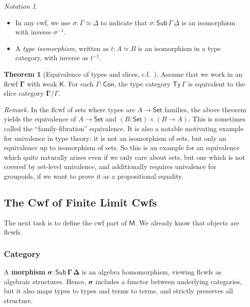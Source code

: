 \documentclass[12pt,a4paper,twoside,openany]{book}
\theoremstyle{remark}
\newtheorem{notation}{Notation}
\theoremstyle{definition}
\theoremstyle{theorem}
\newtheorem{theorem}{Theorem}
\newcommand{\bs}[1]{\boldsymbol{#1}}
\newcommand{\Con}{\mathsf{Con}}
\newcommand{\Sub}{\mathsf{Sub}}
\newcommand{\Ty}{\mathsf{Ty}}
\newcommand{\Set}{\mathsf{Set}}
\newcommand{\K}{\mathsf{K}}
\newcommand{\bSub}{\bs{\Sub}}
\newcommand{\bGamma}{\bs{\Gamma}}
\newcommand{\bDelta}{\bs{\Delta}}
\newcommand{\bsigma}{\bs{\sigma}}
\newcommand{\bM}{\bs{\mathsf{M}}}
\begin{document}
\begin{notation}
  ~\\
  \begin{itemize}
  \item  \vspace{-1.7em}
         In any cwf, we use $\sigma : \Gamma \simeq \Delta$ to indicate
         that $\sigma : \Sub\,\Gamma\,\Delta$ is an isomorphism with inverse $\sigma^{-1}$.
    \item A \emph{type isomorphism}, written as $t : A \simeq B$ is an isomorphism in a
         type category, with inverse as $t^{-1}$.
  \end{itemize}
\end{notation}

\begin{theorem}[Equivalence of types and slices, c.f.\ {\cite[Section 2.2]{clairambault2014biequivalence}}]\label{thm:ty-slice}
Assume that we work in an flcwf $\bGamma$ with weak $\K$. For each $\Gamma : \Con$, the type
category $\Ty\,\Gamma$ is equivalent to the slice category $\bGamma/\Gamma$.
\end{theorem}

\emph{Remark.} In the flcwf of sets where types are $A \to \Set$ families, the
above theorem yields the equivalence of $A \to \Set$ and $(B : \Set) \times (B
\to A)$. This is sometimes called the ``family-fibration'' equivalence. It is
also a notable motivating example for univalence in type theory: it is not an
isomorphism of sets, but only an equivalence up to isomorphism of sets. So this
is an example for an equivalence which quite naturally arises even if we only
care about sets, but one which is not covered by set-level univalence, and
additionally requires univalence for groupoids, if we want to prove it as a
propositional equality.

\subsection{The Cwf of Finite Limit Cwfs}

The next task is to define the cwf part of $\bM$. We already know that objects
are flcwfs.

\subsubsection{Category}

A \textbf{morphism} $\bsigma : \bSub\,\bGamma\,\bDelta$ is an algebra
homomorphism, viewing flcwfs as algebraic structures. Hence, $\bsigma$ includes
a functor between underlying categories, but it also maps types to types and
terms to terms, and strictly preserves all structure.
\end{document}
